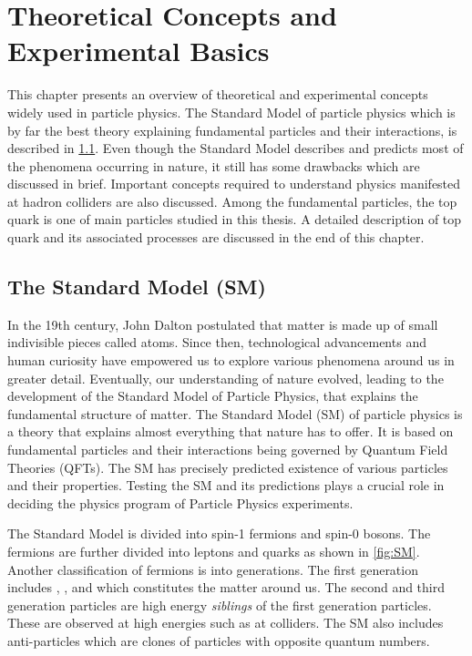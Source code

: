 
\chapter{Theoretical Concepts and Experimental Basics}
\label{sec:SM}

This chapter presents an overview of theoretical and experimental concepts widely used in
particle physics. The Standard Model of particle physics which is by far the best theory explaining
fundamental particles and their interactions, is described in \cref{sec:SMdes}. Even though the 
Standard Model describes and predicts most of the phenomena occurring in nature, it still has some drawbacks
which are discussed in brief. Important concepts required to understand physics manifested 
at hadron colliders are also discussed. Among the fundamental particles, the top quark is one of 
main particles studied in this thesis. A detailed description of top quark and its associated
processes are discussed in the end of this chapter. 


\section{The Standard Model (SM)}
\label{sec:SMdes}

In the 19th century, John Dalton postulated that matter is made up of small indivisible 
pieces called atoms. Since then, technological advancements and human curiosity have empowered 
us to explore various phenomena around us in greater detail. Eventually, our understanding of nature 
evolved, leading to the development of the Standard Model of Particle Physics, that explains the 
fundamental structure of matter. The Standard Model (SM) of particle physics is a 
theory that explains almost everything that nature has to offer. It is based on fundamental particles 
and their interactions being governed by Quantum Field Theories (QFTs). The SM has precisely predicted
existence of various particles and their properties. Testing the SM and its predictions plays a
crucial role in deciding the physics program of Particle Physics experiments.  

The Standard Model is divided into spin-1 fermions and spin-0 bosons. The fermions are
further divided into leptons and quarks as shown in \cref{fig:SM}. Another
classification of fermions is into generations. The first generation includes
\Pup, \Pdown, \Pelectron and \Pnue which constitutes the matter around us. The second
and third generation particles are high energy \textit{siblings} of the first generation
particles. These are observed at high energies such as at colliders. The SM also includes
anti-particles which are clones of particles with opposite quantum numbers.


